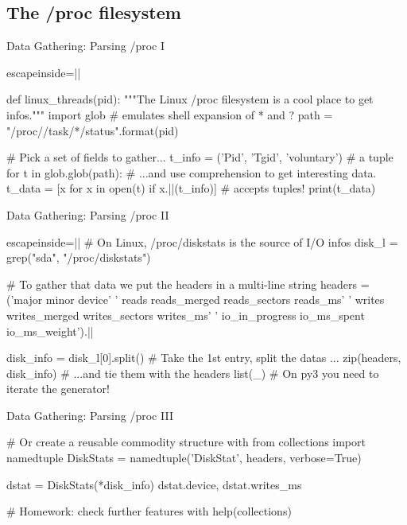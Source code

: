 \subsection{The /proc filesystem}
\begin{pyframe}{Data Gathering: Parsing /proc I}
\begin{pythoncode*}{escapeinside=||}

def linux_threads(pid):
  """The Linux /proc filesystem is a cool place to get infos."""
  import glob # emulates shell expansion of * and ?
  path = "/proc/{}/task/*/status".format(pid)
  
  # Pick a set of fields to gather...
  t_info = ('Pid', 'Tgid', 'voluntary') # a tuple
  for t in glob.glob(path):
    # ...and use comprehension to get interesting data.
    t_data = [x for x in open(t) 
        if x.||(t_info)] #  accepts tuples!
    print(t_data)
\end{pythoncode*}
\end{pyframe}



\begin{pyframe}{Data Gathering: Parsing /proc II}
\begin{pythoncode*}{escapeinside=||}
# On Linux, /proc/diskstats is the source of I/O infos
disk_l = grep("sda", "/proc/diskstats")

# To gather that data we put the headers in a multi-line string
headers = ('major minor device'
        ' reads reads_merged reads_sectors reads_ms'
        ' writes writes_merged writes_sectors writes_ms'
        ' io_in_progress io_ms_spent io_ms_weight').||
        
disk_info = disk_l[0].split() # Take the 1st entry, split the datas ...
zip(headers, disk_info)          # ...and tie them with the headers
list(_) # On py3 you need to iterate the generator!
\end{pythoncode*}
\end{pyframe}

\begin{pyframe}{Data Gathering: Parsing /proc III}
\begin{pythoncode}
# Or create a reusable commodity structure with
from collections import namedtuple
DiskStats = namedtuple('DiskStat', headers, verbose=True)

dstat = DiskStats(*disk_info)
dstat.device, dstat.writes_ms

# Homework: check further features with
help(collections) 
\end{pythoncode}
\end{pyframe}


\iffalse
\begin{pyframe}{Data Gathering: subprocess}
\begin{pythoncode}
# foo
\end{pythoncode}
\end{pyframe}

\fi
